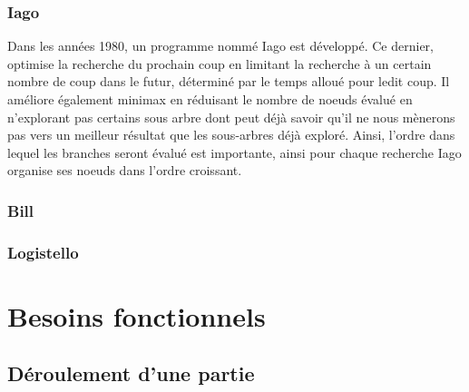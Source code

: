 \documentclass[10pt,a4paper]{article}
\begin{document}
\subsubsection {Iago}
Dans les années 1980, un programme nommé Iago est développé.
Ce dernier, optimise la recherche du prochain coup en limitant la recherche à un certain nombre de coup dans le futur, déterminé par le temps alloué pour ledit coup.
Il améliore également minimax en réduisant le nombre de noeuds évalué en n'explorant pas certains sous arbre dont peut déjà savoir qu'il ne nous mènerons pas vers un meilleur résultat que les sous-arbres déjà exploré. Ainsi, l'ordre dans lequel les branches seront évalué est importante, ainsi pour chaque recherche Iago organise ses noeuds dans l'ordre croissant.



\subsubsection {Bill}

\subsubsection {Logistello}
\newpage
\section{Besoins fonctionnels}
\label{sec:besoins_fonctionnels}

\subsection {Déroulement d'une partie}
\label{sec:deroulement_partie}
\end{document}
